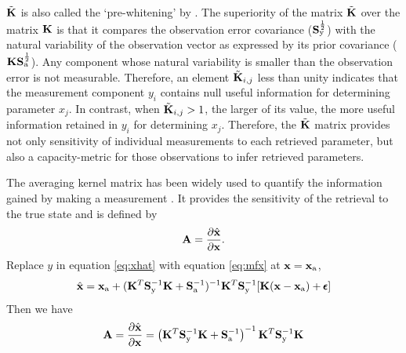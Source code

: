 $\tilde{\mathbf{K}}$ is also called the ‘pre-whitening’ by \cite{Rodgers00}. 
The superiority of the matrix $\tilde{\mathbf{K}}$ over the matrix $\mathbf{K}$ is 
that it compares the observation error covariance
($\mathbf{S}_\text{y}^{\frac{1}{2}}$) with the natural variability of the
observation vector as expressed by its prior covariance
($\mathbf{K}\mathbf{S}_\text{a}^{\frac{1}{2}}$).
Any component whose natural variability is smaller than the observation
error is not measurable. Therefore, an element $\tilde{\mathbf{K}}_{i,j}$ less than
unity indicates that the measurement component $y_i$ contains null useful
information for determining parameter $x_j$. In contrast, when
$\tilde{\mathbf{K}}_{i,j}>1$, the larger of its value, the more useful
information retained in $y_i$ for determining $x_j$. Therefore, the
$\tilde{\mathbf{K}}$ matrix provides not only sensitivity of individual 
measurements to each retrieved parameter, but also a capacity-metric 
for those observations to infer retrieved parameters. 

The averaging kernel matrix has been widely used to quantify the
information gained by making a measurement \citep[e.g.,][]{Rodgers98,
Hasekamp05a, Frankenberg12, Sanghavi12}. It provides the sensitivity of 
the retrieval to the true state and is defined by 
\begin{equation}
\mathbf{A}=\frac{\partial{\hat{\mathbf{x}}}}{\partial\mathbf{x}}. 
\end{equation}
Replace $y$ in equation \eqref{eq:xhat} with equation \eqref{eq:mfx}
at $\mathbf{x}=\mathbf{x}_\text{a}$, 
\begin{equation}
\hat{\mathbf{x}} = \mathbf{x}_\text{a} + (\mathbf{K}^T\mathbf{S}_\text{y}^{-1}\mathbf{K}+\mathbf{S}_\text{a}^{-1})^{-1}
\mathbf{K}^T\mathbf{S}_\text{y}^{-1}[\mathbf{K}(\mathbf{x}-\mathbf{x}_\text{a})+\pmb{\epsilon}] 
\end{equation}
Then we have
\begin{equation}
\mathbf{A}=\frac{\partial{\hat{\mathbf{x}}}}{\partial\mathbf{x}}
    =\left(\mathbf{K}^T\mathbf{S}_\text{y}^{-1}\mathbf{K}+\mathbf{S}_\text{a}^{-1}\right)^{-1}
     \mathbf{K}^T\mathbf{S}_\text{y}^{-1}\mathbf{K}
\end{equation}

